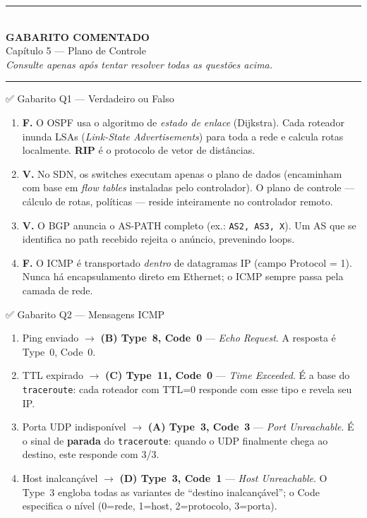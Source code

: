\documentclass[11pt,a4paper]{article}
\begin{document}
\clearpage

\begin{center}
\rule{\textwidth}{2.5pt}\\[8pt]
{\LARGE\bfseries GABARITO COMENTADO}\\[4pt]
{\large Capítulo 5 --- Plano de Controle}\\[6pt]
{\small\itshape Consulte apenas após tentar resolver todas as questões acima.}\\[8pt]
\rule{\textwidth}{2.5pt}
\end{center}
\vspace{1em}

\begin{gabaritocaixa}{✅ Gabarito Q1 --- Verdadeiro ou Falso}
\begin{enumerate}[label=(\alph*)]
    \item \textbf{F.} O OSPF usa o algoritmo de \emph{estado de enlace} (Dijkstra). Cada roteador inunda LSAs (\textit{Link-State Advertisements}) para toda a rede e calcula rotas localmente. \textbf{RIP} é o protocolo de vetor de distâncias.
    \item \textbf{V.} No SDN, os switches executam apenas o plano de dados (encaminham com base em \textit{flow tables} instaladas pelo controlador). O plano de controle --- cálculo de rotas, políticas --- reside inteiramente no controlador remoto.
    \item \textbf{V.} O BGP anuncia o AS-PATH completo (ex.: \texttt{AS2, AS3, X}). Um AS que se identifica no path recebido rejeita o anúncio, prevenindo loops.
    \item \textbf{F.} O ICMP é transportado \emph{dentro} de datagramas IP (campo Protocol = 1). Nunca há encapsulamento direto em Ethernet; o ICMP sempre passa pela camada de rede.
\end{enumerate}
\end{gabaritocaixa}

\begin{gabaritocaixa}{✅ Gabarito Q2 --- Mensagens ICMP}
\begin{enumerate}[label=(\arabic*)]
    \item Ping enviado $\to$ \textbf{(B) Type~8, Code~0} --- \textit{Echo Request}. A resposta é Type~0, Code~0.
    \item TTL expirado $\to$ \textbf{(C) Type~11, Code~0} --- \textit{Time Exceeded}. É a base do \texttt{traceroute}: cada roteador com TTL=0 responde com esse tipo e revela seu IP.
    \item Porta UDP indisponível $\to$ \textbf{(A) Type~3, Code~3} --- \textit{Port Unreachable}. É o sinal de \textbf{parada} do \texttt{traceroute}: quando o UDP finalmente chega ao destino, este responde com 3/3.
    \item Host inalcançável $\to$ \textbf{(D) Type~3, Code~1} --- \textit{Host Unreachable}. O Type~3 engloba todas as variantes de ``destino inalcançável''; o Code especifica o nível (0=rede, 1=host, 2=protocolo, 3=porta).
\end{enumerate}
\end{gabaritocaixa}
\end{document}
